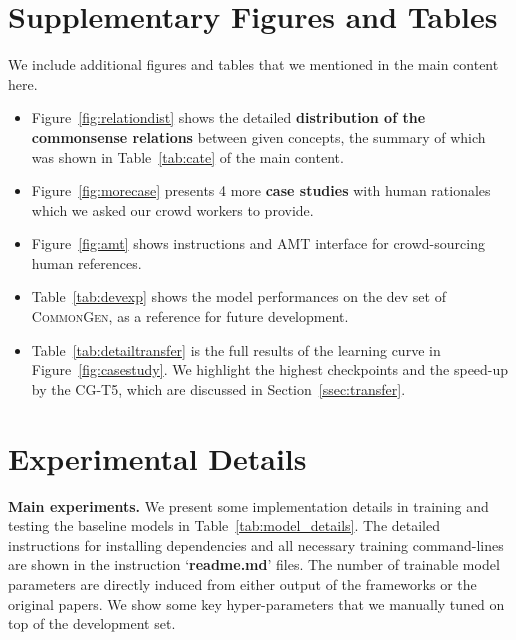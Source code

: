 \documentclass[11pt,a4paper]{article}
\begin{document}
	\clearpage
	\appendix
\section{Supplementary Figures and Tables}
We include additional figures and tables that we mentioned in the main content here.
\begin{itemize}
    \item Figure~\ref{fig:relationdist} shows the detailed \textbf{distribution of the commonsense relations} between given concepts, the summary of which was shown in Table~\ref{tab:cate} of the main content.
    \item  Figure~\ref{fig:morecase} presents 4 more \textbf{case studies} with human rationales which we asked our crowd workers to provide.  
    \item  Figure~\ref{fig:amt} shows instructions and AMT interface for crowd-sourcing human references.
    \item Table~\ref{tab:devexp} shows the model performances on the dev set of \textsc{CommonGen}, as a reference for future development.
    \item Table~\ref{tab:detailtransfer} is the full results of the learning curve in Figure~\ref{fig:casestudy}. We highlight the highest checkpoints and the speed-up by the CG-T5, which are discussed in Section~\ref{ssec:transfer}.
\end{itemize}


\section{Experimental Details}
\textbf{Main experiments.}\quad 
We present some implementation details in training and testing the baseline models in Table~\ref{tab:model_details}.
The detailed instructions for installing dependencies and all necessary training command-lines are shown in the instruction `\textbf{readme.md}' files.
The number of trainable model parameters are directly induced from either output of the frameworks or the original papers.
We show some key hyper-parameters that we manually tuned on top of the development set. 
\end{document}
